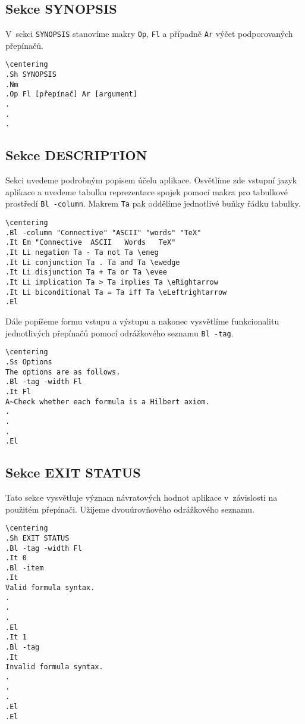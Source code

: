\documentclass[thesis=B,czech,hidelinks]{FITthesis}[2012/06/26]
\begin{document}
\subsection{Sekce SYNOPSIS}

V~sekci \texttt{SYNOPSIS} stanovíme makry \texttt{Op}, \texttt{Fl} a případně \texttt{Ar} výčet podporovaných přepínačů.

\begin{verbatim}
\centering
.Sh SYNOPSIS
.Nm
.Op Fl [přepínač] Ar [argument]
.
.
.
\end{verbatim}

\subsection{Sekce DESCRIPTION}

Sekci uvedeme podrobným popisem účelu aplikace. Osvětlíme zde vstupní jazyk aplikace a uvedeme tabulku reprezentace spojek pomocí makra pro tabulkové prostředí \texttt{Bl -column}. Makrem \texttt{Ta} pak oddělíme jednotlivé buňky řádku tabulky.

\begin{verbatim}
\centering
.Bl -column "Connective" "ASCII" "words" "TeX"
.It Em "Connective	ASCII	Words	TeX"
.It Li negation Ta - Ta not Ta \eneg
.It Li conjunction Ta . Ta and Ta \ewedge
.It Li disjunction Ta + Ta or Ta \evee
.It Li implication Ta > Ta implies Ta \eRightarrow
.It Li biconditional Ta = Ta iff Ta \eLeftrightarrow
.El
\end{verbatim}

Dále popíšeme formu vstupu a výstupu a nakonec vysvětlíme funkcionalitu jednotlivých přepínačů pomocí odrážkového seznamu \texttt{Bl -tag}.

\begin{verbatim}
\centering
.Ss Options
The options are as follows.
.Bl -tag -width Fl
.It Fl
A~Check whether each formula is a Hilbert axiom.
.
.
.
.El
\end{verbatim}

\subsection{Sekce EXIT STATUS}

Tato sekce vysvětluje význam návratových hodnot aplikace v~závislosti na použitém přepínači. Užijeme dvouúrovňového odrážkového seznamu.

\begin{verbatim}
\centering
.Sh EXIT STATUS
.Bl -tag -width Fl
.It 0
.Bl -item
.It
Valid formula syntax.
.
.
.
.El
.It 1
.Bl -tag
.It
Invalid formula syntax.
.
.
.
.El
.El
\end{verbatim}
\end{document}
